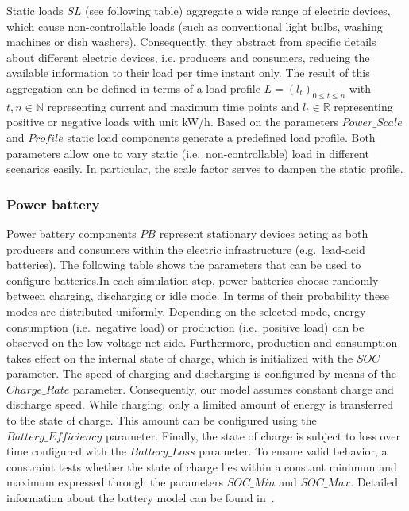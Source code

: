 Static loads $SL$ (see following table) aggregate a wide range of electric devices, which cause non-controllable loads (such as conventional light bulbs, washing machines or dish washers). Consequently, they abstract from specific details about different electric devices, i.e. producers and consumers, reducing the available information to their load per time instant only. The result of this aggregation can be defined in terms of a load profile $L = (l_t)_{0 \leq t \leq n}$ with $t,n \in \mathbb{N}$ representing current and maximum time points and $l_t \in \mathbb{R}$ representing positive or negative loads with unit kW/h. Based on the parameters $Power\_Scale$ and $Profile$ static load components generate a predefined load profile. Both parameters allow one to vary static (i.e.\ non-controllable) load in different scenarios easily. In particular, the scale factor serves to dampen the static profile.

\subsubsection*{Power battery}

Power battery components $PB$ represent stationary devices acting as both producers and consumers within the electric infrastructure (e.g.\ lead-acid batteries). The following table shows the parameters that can be used to configure batteries.In each simulation step, power batteries choose randomly between charging, discharging or idle mode. In terms of their probability these modes are distributed uniformly. Depending on the selected mode, energy consumption (i.e.\ negative load) or production (i.e.\ positive load) can be observed on the low-voltage net side. Furthermore, production and consumption takes effect on the internal state of charge, which is initialized with the $SOC$ parameter. The speed of charging and discharging is configured by means of the $Charge\_Rate$ parameter. Consequently, our model assumes constant charge and discharge speed. While charging, only a limited amount of energy is transferred to the state of charge. This amount can be configured using the $Battery\_Efficiency$ parameter. Finally, the state of charge is subject to loss over time configured with the $Battery\_Loss$ parameter. To ensure valid behavior, a constraint tests whether the state of charge lies within a constant minimum and maximum expressed through the parameters $SOC\_Min$ and $SOC\_Max$. Detailed information about the battery model can be found in~\cite{hackenberg2014rapid}.

